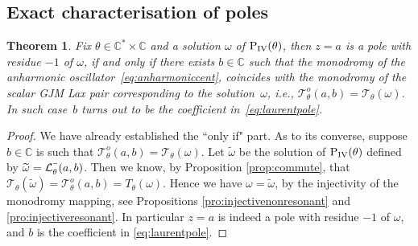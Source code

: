 \documentclass[pdftex]{sigma}
\numberwithin{equation}{section}
\newcommand{\minus}{\scalebox{0.6}[1.0]{$-$}}
\newtheorem{thm}{Theorem}[section]
\newcommand{\om}{\omega}
\begin{document}
\subsection{Exact characterisation of poles}\label{section:proofofcharacterisations}
\begin{thm}\label{thm:exactchar}
	Fix $\theta\in\mathbb{C}^*\times\mathbb{C}$ and a solution $\om$ of ${\rm P}_{\rm IV}(\theta)$, then $z=a$ is a pole with residue $-1$ of $\om$, if and only if there exists $b\in\mathbb{C}$ such that the monodromy of the anharmonic oscillator~\eqref{eq:anharmoniccent}, coincides with the monodromy of the scalar GJM Lax pair corresponding to the solution~$\om$, i.e., $\mathcal{T}_\theta^o(a,b)=\mathcal{T}_\theta(\om)$. In such case~$b$ turns out to be the coefficient in~\eqref{eq:laurentpole}.
\end{thm}
\begin{proof}
We have already established the ``only if" part. As to its converse, suppose $b\in\mathbb{C}$ is such that $\mathcal{T}_\theta^o(a,b)=\mathcal{T}_\theta(\om)$. Let $\widetilde{\om}$ be the solution of ${\rm P}_{\rm IV}(\theta)$ def\/ined by $\widetilde{\om}=\mathcal{L}_\theta^{\minus}(a,b)$. Then we know, by Proposition \ref{prop:commute}, that $\mathcal{T}_\theta(\widetilde{\om})=\mathcal{T}_\theta^o(a,b)=T_\theta(\om)$. Hence we have $\om=\widetilde{\om}$, by the injectivity of the monodromy mapping, see Propositions \ref{pro:injectivenonresonant} and \ref{pro:injectiveresonant}. In particular $z=a$ is indeed a pole with residue $-1$ of $\om$, and $b$ is the coef\/f\/icient in \eqref{eq:laurentpole}.
\end{proof}
\end{document}
